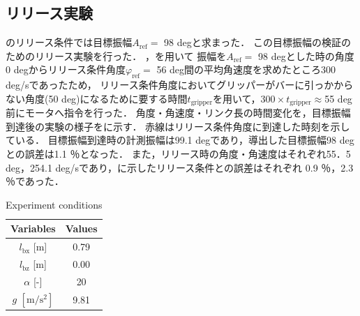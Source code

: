           
          \subsection{リリース実験}

          のリリース条件では目標振幅$A_{\mathrm{ref}} =$ 98 degと求まった．
          この目標振幅の検証のためのリリース実験を行った．
          ，を用いて
          振幅を$A_{\mathrm{ref}} =$ 98 degとした時の角度0 degからリリース条件角度$\varphi_{\mathrm{ref}} =$ 56 deg間の平均角速度を求めたところ300 deg/sであったため，
          リリース条件角度においてグリッパーがバーに引っかからない角度(50 deg)になるために要する時間$t_{\mathrm{gripper}}$を用いて，$300\times t_{\mathrm{gripper}}\approx$55 deg前にモータへ指令を行った．
          角度・角速度・リンク長の時間変化を，目標振幅到達後の実験の様子をに示す．
          赤線はリリース条件角度に到達した時刻を示している．
          目標振幅到達時の計測振幅は99.1 degであり，導出した目標振幅98 degとの誤差は1.1 ％となった．
          また，リリース時の角度・角速度はそれぞれ55．5 deg，254.1 deg/sであり，に示したリリース条件との誤差はそれぞれ
          0.9 ％，2.3 ％であった．
          \begin{table}[tb]
            \begin{center}
              \caption{Experiment conditions}
              \vspace{2mm}
              \begin{tabular}{c|c}
                \hline
                Variables & Values \\
                \hline
                $l_{\mathrm{bx}}$ [m] & 0.79 \\
                $l_{\mathrm{bz}}$ [m] & 0.00 \\
                $\alpha$ [-]& 20 \\
                $g$ $\mathrm{[m/s^2]}$ & 9.81 \\
                \hline
              \end{tabular}
            \end{center}
          \end{table}
